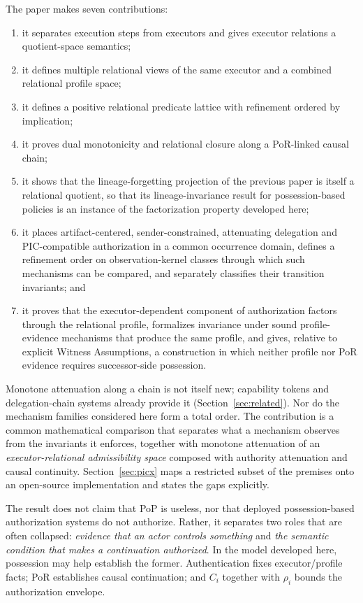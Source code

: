 \documentclass[10pt,twocolumn]{article}
\begin{document}
The paper makes seven contributions:
\begin{enumerate}
    \item it separates execution steps from executors and gives executor
    relations a quotient-space semantics;
    \item it defines multiple relational views of the same executor and a
    combined relational profile space;
    \item it defines a positive relational predicate lattice with refinement
    ordered by implication;
    \item it proves dual monotonicity and relational closure along a PoR-linked
    causal chain;
    \item it shows that the lineage-forgetting projection of the previous
    paper is itself a relational quotient, so that its lineage-invariance
    result for possession-based policies is an instance of the factorization property
    developed here;
    \item it places artifact-centered, sender-constrained, attenuating
    delegation and PIC-compatible authorization in a common occurrence domain,
    defines a refinement order on observation-kernel classes through which
    such mechanisms can be compared, and separately classifies their
    transition invariants; and
    \item it proves that the executor-dependent component of authorization
    factors through the relational profile, formalizes invariance under sound
    profile-evidence mechanisms that produce the same profile, and gives,
    relative to explicit Witness Assumptions, a construction in which neither
    profile nor PoR evidence requires successor-side possession.
\end{enumerate}

Monotone attenuation along a chain is not itself new; capability tokens and
delegation-chain systems already provide it (Section~\ref{sec:related}). Nor
do the mechanism families considered here form a total order. The contribution
is a common mathematical comparison that separates what a mechanism observes
from the invariants it enforces, together with monotone attenuation of an
\emph{executor-relational admissibility space} composed with authority
attenuation and causal continuity. Section~\ref{sec:picx} maps a restricted
subset of the premises onto an open-source implementation and states the gaps
explicitly.

The result does not claim that PoP is useless, nor that deployed
possession-based authorization systems do not authorize. Rather, it separates
two roles that are often collapsed: \emph{evidence that an actor controls
something} and \emph{the semantic condition that makes a continuation
authorized}. In the model developed here, possession may help establish the
former. Authentication fixes executor/profile facts; PoR establishes causal
continuation; and \(C_i\) together with \(\rho_i\) bounds the authorization
envelope.
\end{document}
